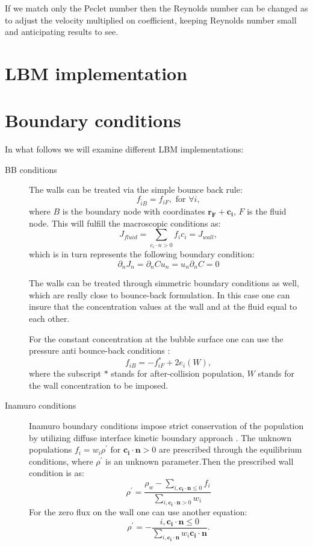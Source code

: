 \documentclass{article}
\begin{document}
If we match only the Peclet number then the Reynolds number can be changed as to adjust the
velocity multiplied on coefficient, keeping Reynolds number small and anticipating results to see.


\section{LBM implementation}

\appendix

\section{Boundary conditions}
In what follows we will examine different LBM implementations:
\begin{description}
 \item[BB conditions] The walls can be treated via the simple bounce back rule:
\begin{equation}
f_{\bar{i}B}=f_{iF},\text{ for } \forall i,
\end{equation}
where $B$ is the boundary node with coordinates $\bm{r_F}+\bm{c_i}$, $F$ is the fluid node. This
will fulfill the macroscopic conditions as:
\begin{equation}
J_{fluid}= \sum_{c_i\cdot n>0}{f_i c_i}=J_{wall},
\end{equation}
which is in turn represents the following boundary condition:
\begin{equation}
\partial_n J_n=\partial_n C u_n = u_n \partial_n C=0
\end{equation}

The walls can be treated through simmetric boundary conditions as well, which are really close to
bounce-back formulation. In this case one can insure that the concentration values at the wall and
at the fluid equal to each other. 

For the constant concentration at the bubble surface one can use the pressure anti
bounce-back conditions
\cite{ginzburg-boundary-main}:
\begin{equation}
f_{iB}=-f^{*}_{iF}+2 e_i(W),
\end{equation}
where the subscript $*$ stands for after-collision population, $W$ stands for the wall
concentration to be imposed.
\item[Inamuro conditions] Inamuro boundary conditions impose strict conservation of the population
by utilizing diffuse interface kinetic boundary approach \cite{inamuro-scalar-boundary}. The
unknown populations $f_i=w_i \rho^{\prime}\text{ for } \bm{c_i}\cdot \bm{n}>0$ are prescribed
through the equilibrium conditions, where $\rho^{\prime}$ is an unknown parameter.Then the
prescribed wall condition is as: 
\begin{equation}
\rho^{\prime}=\frac{\rho_{w}-\sum_{i,\bm{c_i}\cdot\bm{n}\leq0}
f_i}{\sum_{i,\bm{c_i}\cdot\bm{n}>0}w_i}
\end{equation}
For the zero flux on the wall one can use another equation:
\begin{equation}
\rho^{\prime}=-\frac{i,\bm{c_i}\cdot\bm{n}\leq0}{\sum_{i,\bm{c_i}\cdot \bm{n}}{w_i \bm{c_i}\cdot
\bm{n}}}.
\end{equation}
\end{description}
\end{document}
